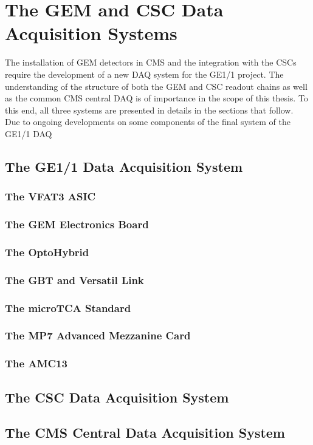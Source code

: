 \chapter{The GEM and CSC Data Acquisition Systems}
\label{chap:II-2-daq}

  The installation of GEM detectors in CMS and the integration with the CSCs require the development of a new DAQ system for the GE1/1 project. The understanding of the structure of both the GEM and CSC readout chains as well as the common CMS central DAQ is of importance in the scope of this thesis. To this end, all three systems are presented in details in the sections that follow. \\

  Due to ongoing developments on some components of the final system of the GE1/1 DAQ

  \section{The GE1/1 Data Acquisition System}

    \subsection{The VFAT3 ASIC}

    \subsection{The GEM Electronics Board}

    \subsection{The OptoHybrid}

    \subsection{The GBT and Versatil Link}

    \subsection{The microTCA Standard}

    \subsection{The MP7 Advanced Mezzanine Card}

    \subsection{The AMC13}

  \section{The CSC Data Acquisition System}

  \section{The CMS Central Data Acquisition System}
